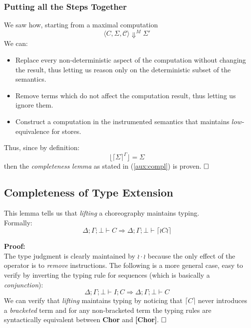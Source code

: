 \documentclass[12pt,a4paper,twoside]{book}
\newcommand{\qed}{\hfill\square}
\begin{document}
\subsubsection{Putting all the Steps Together}
We saw how, starting from a maximal computation
$$\langle C, \Sigma, \mathscr{C}\rangle \Downarrow^M \Sigma'$$
We can:
\begin{itemize}
\item Replace every non-deterministic aspect of the computation without changing the result, thus letting us reason only on the deterministic subset of the semantics.
\item Remove terms which do not affect the computation result, thus letting us ignore them.
\item Construct a computation in the instrumented semantics that maintains $low$-equivalence for stores.
\end{itemize}
Thus, since by definition:
$$ \lfloor \lceil \Sigma \rceil^\Gamma \rfloor = \Sigma $$
then the \emph{completeness lemma} as stated in (\ref{aux:compl}) is proven. $\qed$


\subsection{Completeness of Type Extension}\label{aux:ext_tj}
This lemma tells us that \emph{lifting} a choreography maintains typing.\\
Formally:
$$
\Delta;\Gamma;\bot \vdash C \Rightarrow
\Delta;\Gamma;\bot \vdash \lceil \wr C \wr \rceil
$$

\noindent\textbf{Proof:}\\
The type judgment is clearly maintained by $\wr \cdot \wr$ because the only effect of the operator is to \emph{remove} instructions.
The following is a more general case, easy to verify by inverting the typing rule for sequences (which is basically a \emph{conjunction}):
$$
\Delta;\Gamma;\bot \vdash I;C \Rightarrow \Delta;\Gamma;\bot \vdash C
$$
We can verify that \emph{lifting} maintains typing by noticing that $\lceil C \rceil$ never introduces a \emph{bracketed} term and for any non-bracketed term the typing rules are syntactically equivalent between \textbf{Chor} and \textbf{[Chor]}.
$\qed$
\end{document}
